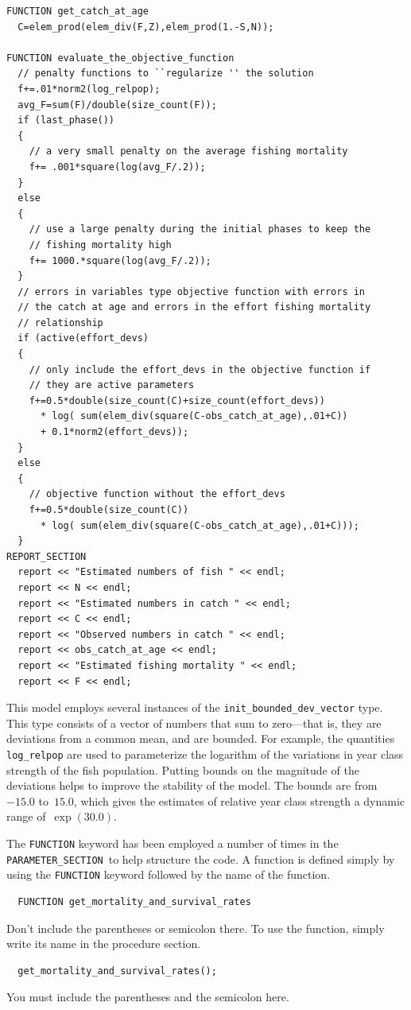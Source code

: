 \documentclass{admbmanual}
\newcommand\PS{\texttt{PARAMETER\_SECTION}}
\begin{document}
\begin{lstlisting}
FUNCTION get_catch_at_age
  C=elem_prod(elem_div(F,Z),elem_prod(1.-S,N));

FUNCTION evaluate_the_objective_function
  // penalty functions to ``regularize '' the solution
  f+=.01*norm2(log_relpop);
  avg_F=sum(F)/double(size_count(F));
  if (last_phase())
  {
    // a very small penalty on the average fishing mortality
    f+= .001*square(log(avg_F/.2));
  }
  else
  {
    // use a large penalty during the initial phases to keep the
    // fishing mortality high
    f+= 1000.*square(log(avg_F/.2));
  }
  // errors in variables type objective function with errors in
  // the catch at age and errors in the effort fishing mortality
  // relationship
  if (active(effort_devs)
  {
    // only include the effort_devs in the objective function if
    // they are active parameters
    f+=0.5*double(size_count(C)+size_count(effort_devs))
      * log( sum(elem_div(square(C-obs_catch_at_age),.01+C))
      + 0.1*norm2(effort_devs));
  }
  else
  {
    // objective function without the effort_devs
    f+=0.5*double(size_count(C))
      * log( sum(elem_div(square(C-obs_catch_at_age),.01+C)));
  }
REPORT_SECTION
  report << "Estimated numbers of fish " << endl;
  report << N << endl; 
  report << "Estimated numbers in catch " << endl;
  report << C << endl; 
  report << "Observed numbers in catch " << endl;
  report << obs_catch_at_age << endl; 
  report << "Estimated fishing mortality " << endl;
  report << F << endl; 
\end{lstlisting}
This model employs several instances of the
\texttt{init\_bounded\_dev\_vector} type.
This type consists of a vector of numbers that
sum to zero---that is, they are deviations from a common mean,
and are bounded. For example, the quantities \texttt{log\_relpop}
are used to parameterize the logarithm of the variations in
year class strength of the fish population. Putting bounds on
the magnitude of the deviations helps to improve the stability of the model.
The bounds are from~$-15.0$ to~$15.0$, which gives the estimates of
relative year class strength a dynamic range of~$\exp(30.0)$. 

The \texttt{FUNCTION} keyword has been employed a number of times
in the 
\PS\ to help structure the code. 
A function is defined simply by using the \texttt{FUNCTION} keyword
followed by the name of the function.
\begin{lstlisting}
  FUNCTION get_mortality_and_survival_rates
\end{lstlisting}
Don't include the parentheses or semicolon there.
To use the function, simply write its name in the procedure
section. 
\begin{lstlisting}
  get_mortality_and_survival_rates();
\end{lstlisting}
You must include the parentheses and the semicolon here.
\end{document}
